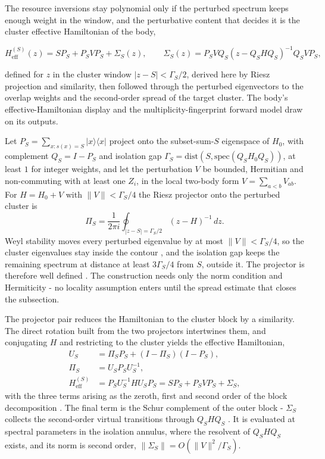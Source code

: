 The resource inversions stay polynomial only if the perturbed spectrum keeps enough weight in the window, and the perturbative content that decides it is the cluster effective Hamiltonian of the body,
\begin{widetext}
\begin{equation*}
H_{\mathrm{eff}}^{(S)}(z) = S P_S + P_S V P_S + \Sigma_S(z) , \qquad
\Sigma_S(z) = P_S V Q_S \left( z - Q_S H Q_S \right)^{-1} Q_S V P_S ,
\end{equation*}
\end{widetext}
defined for $z$ in the cluster window $|z - S| < \Gamma_S/2$, derived here by Riesz projection and similarity, then followed through the perturbed eigenvectors to the overlap weights and the second-order spread of the target cluster. The body's effective-Hamiltonian display and the multiplicity-fingerprint forward model draw on its outputs.

Let $P_S = \sum_{x : s(x) = S} |x\rangle\langle x|$ project onto the subset-sum-$S$ eigenspace of $H_0$, with complement $Q_S = I - P_S$ and isolation gap $\Gamma_S = \mathrm{dist}(S, \mathrm{spec}(Q_S H_0 Q_S))$, at least $1$ for integer weights, and let the perturbation $V$ be bounded, Hermitian and non-commuting with at least one $Z_i$, in the local two-body form $V = \sum_{a < b} V_{ab}$. For $H = H_0 + V$ with $\|V\| < \Gamma_S/4$ the Riesz projector onto the perturbed cluster is
\begin{equation*}
\Pi_S = \frac{1}{2\pi i} \oint_{|z - S| = \Gamma_S/2} (z - H)^{-1} \, dz .
\end{equation*}
Weyl stability moves every perturbed eigenvalue by at most $\|V\| < \Gamma_S/4$, so the cluster eigenvalues stay inside the contour \cite{bhatia1997matrix}, and the isolation gap keeps the remaining spectrum at distance at least $3\Gamma_S/4$ from $S$, outside it. The projector is therefore well defined \cite{kato1995perturbation}. The construction needs only the norm condition and Hermiticity - no locality assumption enters until the spread estimate that closes the subsection.

The projector pair reduces the Hamiltonian to the cluster block by a similarity. The direct rotation built from the two projectors intertwines them, and conjugating $H$ and restricting to the cluster yields the effective Hamiltonian,
\begin{align*}
U_S &= \Pi_S P_S + (I - \Pi_S)(I - P_S) , \\
\Pi_S &= U_S P_S U_S^{-1} , \\
H_{\mathrm{eff}}^{(S)} &= P_S U_S^{-1} H U_S P_S = S P_S + P_S V P_S + \Sigma_S ,
\end{align*}
with the three terms arising as the zeroth, first and second order of the block decomposition \cite{kato1995perturbation}. The final term is the Schur complement of the outer block - $\Sigma_S$ collects the second-order virtual transitions through $Q_S H Q_S$ \cite{horn2013matrix}. It is evaluated at spectral parameters in the isolation annulus, where the resolvent of $Q_S H Q_S$ exists, and its norm is second order, $\|\Sigma_S\| = O(\|V\|^2 / \Gamma_S)$.

